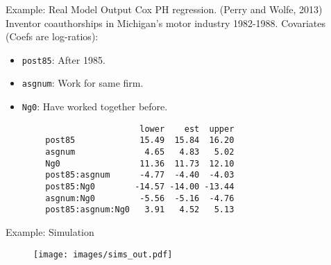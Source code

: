 \documentclass{beamer}
\begin{document}
\begin{frame}[fragile]{Example: Real Model Output}
     \alert{Cox PH regression.} (Perry and Wolfe, 2013)     
     \newline
     Inventor coauthorships in Michigan's motor industry 1982-1988.
     \newline
     \newline
     Covariates (Coefs are log-ratios):
     \begin{itemize}
         \item \texttt{post85}: After 1985.
         \item \texttt{asgnum}: Work for same firm.
         \item \texttt{Ng0}: Have worked together before.
     \end{itemize}
     
     \begin{verbatim}
                           lower    est  upper 
        post85             15.49  15.84  16.20
        asgnum              4.65   4.83   5.02
        Ng0                11.36  11.73  12.10
        post85:asgnum      -4.77  -4.40  -4.03
        post85:Ng0        -14.57 -14.00 -13.44
        asgnum:Ng0         -5.56  -5.16  -4.76
        post85:asgnum:Ng0   3.91   4.52   5.13
     \end{verbatim}
\end{frame}

\begin{frame}{Example: Simulation}
    \begin{figure}
        \centering
        \texttt{[image: images/sims\_out.pdf]}
    \end{figure}
\end{frame}
\end{document}
